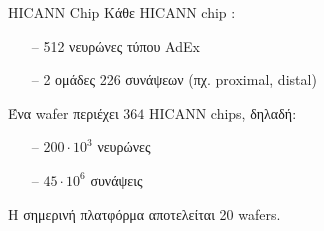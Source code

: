 \documentclass[11pt,center]{beamer}
\begin{document}
\begin{frame} {HICANN Chip}
  Κάθε HICANN chip \tiny{\cite{wafer}}:
  \begin{itemize}
	\item[--] 512 νευρώνες τύπου AdEx
	\item[--] 2 ομάδες 226 συνάψεων (πχ. proximal, distal)
  \end{itemize}
  \pause
  \vfill
  Ένα wafer περιέχει $364$ HICANN chips, δηλαδή:
  \begin{itemize}
	\item[--] $200\cdot 10^3$ νευρώνες
	\item[--]$45\cdot 10^6$ συνάψεις
  \end{itemize}
  \pause
  \vfill
  Η σημερινή πλατφόρμα αποτελείται 20 wafers.

\end{frame}
\end{document}
